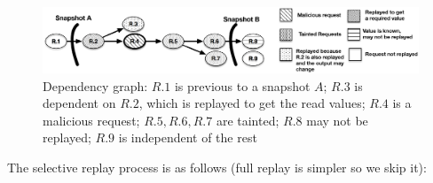 \begin{figure}
\centering
\includegraphics[width=150mm]{images/selectiveDependency_legended}
\caption[Dependency graph]{Dependency graph: $R.1$ is previous to a snapshot $A$; $R.3$ is dependent on $R.2$, which is replayed to get the read values; $R.4$ is a malicious request; $R.5,R.6,R.7$ are tainted; $R.8$ may not be replayed; $R.9$ is independent of the rest}
\label{fig:selectiveGraph}
\end{figure}

The selective replay process is as follows (full replay is simpler so we skip it):
